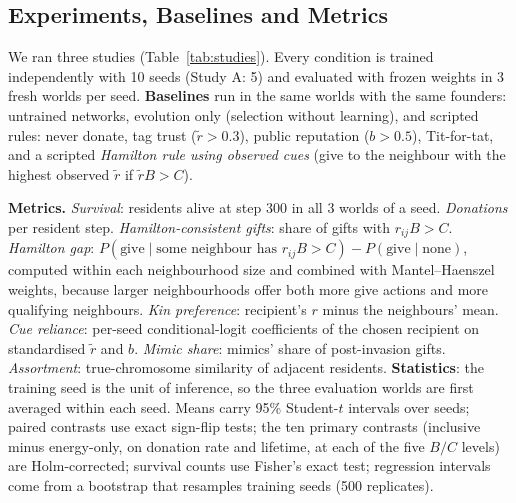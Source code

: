\documentclass{article}
\begin{document}
\subsection{Experiments, Baselines and Metrics}
We ran three studies (Table~\ref{tab:studies}). Every condition is trained independently with 10 seeds (Study A: 5) and evaluated with frozen weights in 3 fresh worlds per seed. \textbf{Baselines} run in the same worlds with the same founders: untrained networks, evolution only (selection without learning), and scripted rules: never donate, tag trust ($\tilde r>0.3$), public reputation ($b>0.5$), Tit-for-tat, and a scripted \emph{Hamilton rule using observed cues} (give to the neighbour with the highest observed $\tilde r$ if $\tilde rB>C$).

\textbf{Metrics.} \emph{Survival}: residents alive at step 300 in all 3 worlds of a seed. \emph{Donations} per resident step. \emph{Hamilton-consistent gifts}: share of gifts with $r_{ij}B>C$. \emph{Hamilton gap}: $P(\text{give}\mid\text{some neighbour has } r_{ij}B>C)-P(\text{give}\mid\text{none})$, computed within each neighbourhood size and combined with Mantel--Haenszel weights, because larger neighbourhoods offer both more give actions and more qualifying neighbours. \emph{Kin preference}: recipient's $r$ minus the neighbours' mean. \emph{Cue reliance}: per-seed conditional-logit coefficients of the chosen recipient on standardised $\tilde r$ and $b$. \emph{Mimic share}: mimics' share of post-invasion gifts. \emph{Assortment}: true-chromosome similarity of adjacent residents. \textbf{Statistics}: the training seed is the unit of inference, so the three evaluation worlds are first averaged within each seed. Means carry 95\% Student-$t$ intervals over seeds; paired contrasts use exact sign-flip tests; the ten primary contrasts (inclusive minus energy-only, on donation rate and lifetime, at each of the five $B/C$ levels) are Holm-corrected; survival counts use Fisher's exact test; regression intervals come from a bootstrap that resamples training seeds (500 replicates).
\end{document}
